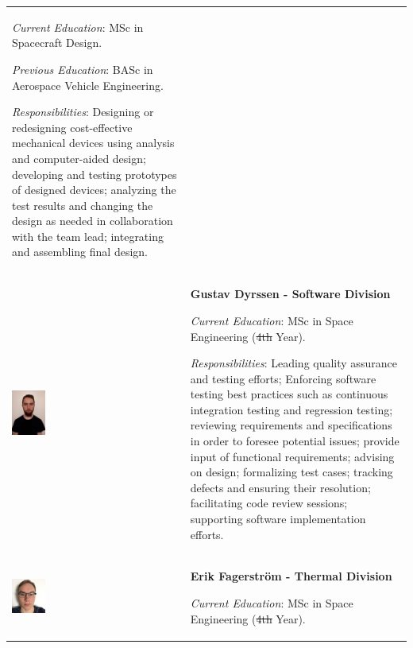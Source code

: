 \documentclass[a4paper,12pt,oneside]{article} %
\providecommand{\DIFaddtex}[1]{{\protect\color{blue}\uwave{#1}}} %
\providecommand{\DIFdeltex}[1]{{\protect\color{red}\sout{#1}}}                      %
\providecommand{\DIFaddbegin}{} %
\providecommand{\DIFaddend}{} %
\providecommand{\DIFdelbegin}{} %
\providecommand{\DIFdelend}{} %
\providecommand{\DIFadd}[1]{\texorpdfstring{\DIFaddtex{#1}}{#1}} %
\providecommand{\DIFdel}[1]{\texorpdfstring{\DIFdeltex{#1}}{}} %
\newcommand{\DIFscaledelfig}{0.5}
\newlength{\DIFdelgraphicswidth} %
\newlength{\DIFdelgraphicsheight} %
\newcommand{\DIFaddincludegraphics}[2][]{{\color{blue}\fbox{\DIFOincludegraphics[#1]{#2}}}} %
\newcommand{\DIFdelincludegraphics}[2][]{%
\sbox{\DIFdelgraphicsbox}{\DIFOincludegraphics[#1]{#2}}%
\settoboxwidth{\DIFdelgraphicswidth}{\DIFdelgraphicsbox} %
\settoboxtotalheight{\DIFdelgraphicsheight}{\DIFdelgraphicsbox} %
\scalebox{\DIFscaledelfig}{%
\parbox[b]{\DIFdelgraphicswidth}{\usebox{\DIFdelgraphicsbox}\\[-\baselineskip] \rule{\DIFdelgraphicswidth}{0em}}\llap{\resizebox{\DIFdelgraphicswidth}{\DIFdelgraphicsheight}{%
\setlength{\unitlength}{\DIFdelgraphicswidth}%
\begin{picture}(1,1)%
\thicklines\linethickness{2pt} %
{\color[rgb]{1,0,0}\put(0,0){\framebox(1,1){}}}%
{\color[rgb]{1,0,0}\put(0,0){\line( 1,1){1}}}%
{\color[rgb]{1,0,0}\put(0,1){\line(1,-1){1}}}%
\end{picture}%
}\hspace*{3pt}}} %
} %
\DeclareRobustCommand{\DIFaddbegin}{\DIFOaddbegin \let\includegraphics\DIFaddincludegraphics} %
\DeclareRobustCommand{\DIFaddend}{\DIFOaddend \let\includegraphics\DIFOincludegraphics} %
\DeclareRobustCommand{\DIFdelbegin}{\DIFOdelbegin \let\includegraphics\DIFdelincludegraphics} %
\DeclareRobustCommand{\DIFdelend}{\DIFOaddend \let\includegraphics\DIFOincludegraphics} %
\begin{document}
\begin{longtable}[]{m{} m{}}
\smallskip
\textit{Current Education}: MSc in Spacecraft Design.

\smallskip
\textit{Previous Education}: BASc in Aerospace Vehicle Engineering.

\smallskip
\textit{Responsibilities}: Designing or redesigning cost-effective mechanical devices using analysis and computer-aided design; developing and testing prototypes of designed devices; analyzing the test results and changing the design as needed in collaboration with the team lead; integrating and assembling final design.
\bigskip
\\

\includegraphics[width=0.2\textwidth]{1-introduction/img/gustav-dryssen.jpg} & \textbf{Gustav Dyrssen - Software Division}

\smallskip
\textit{Current Education}: MSc in Space Engineering (\DIFdelbegin \DIFdel{4th }\DIFdelend \DIFaddbegin \DIFadd{5th }\DIFaddend Year).

\smallskip
\textit{Responsibilities}: Leading quality assurance and testing efforts; Enforcing software testing best practices such as continuous integration testing and regression testing; reviewing requirements and specifications in order to foresee potential issues; provide input of functional requirements; advising on design; formalizing test cases; tracking defects and ensuring their resolution; facilitating code review sessions; supporting software implementation efforts.     
\bigskip
\\


\includegraphics[width=0.2\textwidth]{1-introduction/img/erik-fagerstrom.jpg} & \textbf{Erik Fagerström - Thermal Division}

\smallskip
\textit{Current Education}: MSc in Space Engineering (\DIFdelbegin \DIFdel{4th }\DIFdelend \DIFaddbegin \DIFadd{5th }\DIFaddend Year).



\end{longtable}
\end{document}
